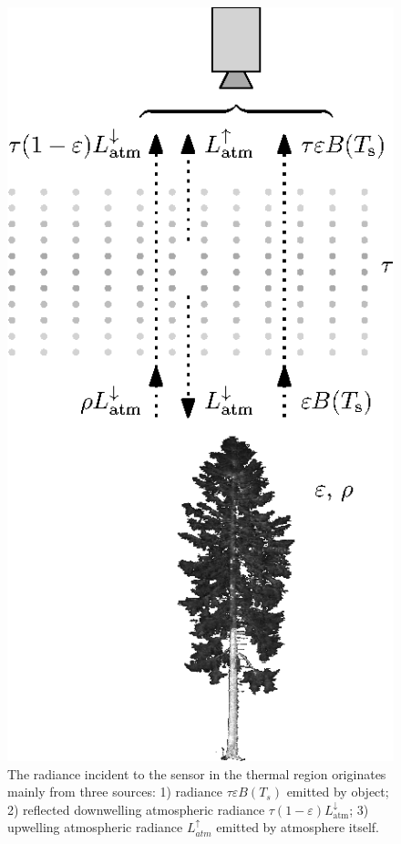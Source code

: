 \begin{figure}[htbp]
	\centering
	\vspace{1em}
	\includegraphics{pics/Chapter_02/Fig_3_2.eps}
	\vspace{1.5 em}
	\caption{The radiance incident to the sensor in the thermal region originates mainly from three sources: 1) radiance $\tau\varepsilon B(T_s)$ emitted by object; 2) reflected downwelling atmospheric radiance $\tau(1-\varepsilon)L_\mathrm{atm}^\downarrow$; 3) upwelling atmospheric radiance $L_{atm}^\uparrow$ emitted by atmosphere itself.}
	\label{fig:FigRTE}
\end{figure}

